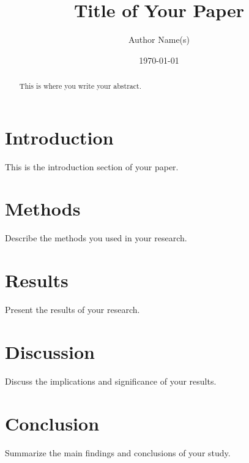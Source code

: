 \documentclass{article}
\title{Title of Your Paper}
\author{Author Name(s)}
\date{\today}
\begin{document}
\maketitle

\begin{abstract}
This is where you write your abstract.
\end{abstract}

\section{Introduction}
This is the introduction section of your paper.

\section{Methods}
Describe the methods you used in your research.

\section{Results}
Present the results of your research.

\section{Discussion}
Discuss the implications and significance of your results.

\section{Conclusion}
Summarize the main findings and conclusions of your study.



\end{document}

